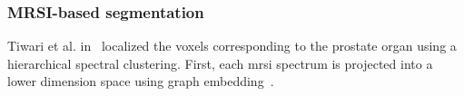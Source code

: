 \subsubsection{MRSI-based segmentation}

Tiwari et al. in~\cite{Tiwari2009} localized the voxels corresponding to the prostate organ using a hierarchical spectral clustering. First, each \ac{mrsi} spectrum is projected into a lower dimension space using graph embedding~\cite{Shi2000}.

